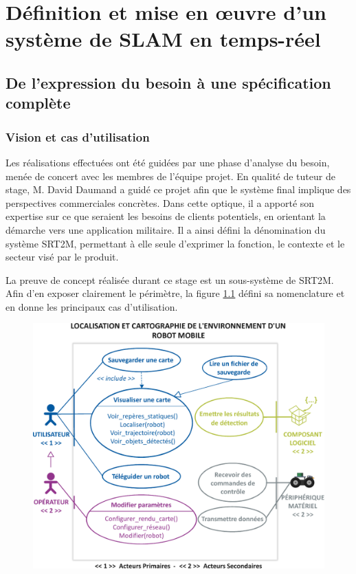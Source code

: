 \chapter{Définition et mise en \oe{}uvre d'un système de SLAM en temps-réel}

\section{De l'expression du besoin à une spécification complète}

  \subsection{Vision et cas d'utilisation}

Les réalisations effectuées ont été guidées par une phase d'analyse du besoin, menée de concert avec les membres de l'équipe projet. 
En qualité de tuteur de stage, M. David Daumand a guidé ce projet afin que le système final implique des perspectives commerciales concrètes. 
Dans cette optique, il a apporté son expertise sur ce que seraient les besoins de clients potentiels, en orientant la démarche vers une application militaire. 
Il a ainsi défini la dénomination du système \gls{SRT2M}, permettant à elle seule d'exprimer la fonction, le contexte et le secteur visé par le produit.  

La preuve de concept réalisée durant ce stage est un sous-système de \gls{SRT2M}. 
Afin d'en exposer clairement le périmètre, la figure \ref{fig:use-case} défini sa nomenclature et en donne les principaux cas d'utilisation. 

\begin{figure}[h]
  \centering
    \includegraphics[width=.8\linewidth]{figures/use-case}  
  \label{fig:use-case}
\end{figure}

